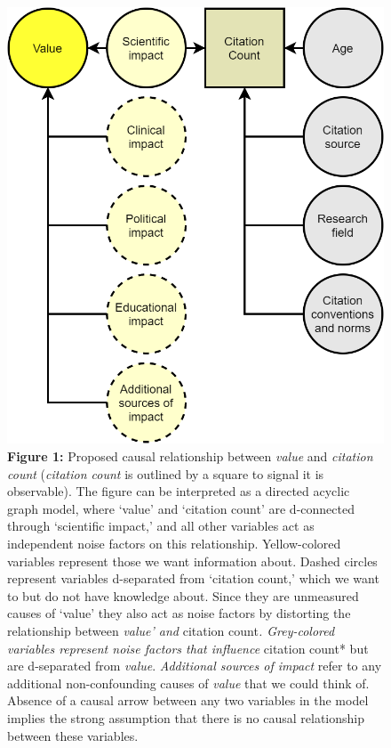 \documentclass[
  english,
  jou,floatsintext]{apa6}
\begin{document}
\begin{figure}
\centering
\includegraphics{figure_1.png}
\caption{\textbf{Figure 1:} Proposed causal relationship between \emph{value} and \emph{citation count} (\emph{citation count} is outlined by a square to signal it is observable). The figure can be interpreted as a directed acyclic graph model, where `value' and `citation count' are d-connected through `scientific impact,' and all other variables act as independent noise factors on this relationship. Yellow-colored variables represent those we want information about. Dashed circles represent variables d-separated from `citation count,' which we want to but do not have knowledge about. Since they are unmeasured causes of `value' they also act as noise factors by distorting the relationship between \emph{value' and }citation count\emph{. Grey-colored variables represent noise factors that influence }citation count* but are d-separated from \emph{value}. \emph{Additional sources of impact} refer to any additional non-confounding causes of \emph{value} that we could think of. Absence of a causal arrow between any two variables in the model implies the strong assumption that there is no causal relationship between these variables. \label{fig:1}}
\end{figure}
\end{document}
